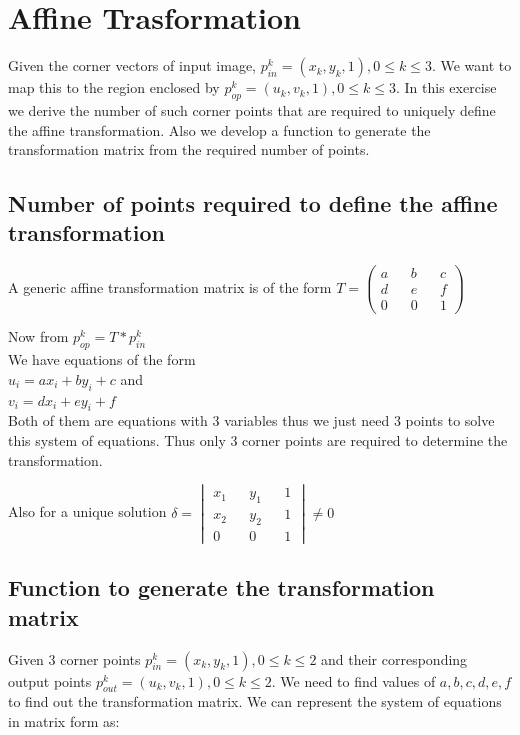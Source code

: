 \documentclass[paper=a4, fontsize=11pt]{scrartcl} %
\numberwithin{equation}{section} %
\numberwithin{figure}{section} %
\numberwithin{table}{section} %
\begin{document}
\section{Affine Trasformation}

Given the corner vectors of input image, \(p_{in}^k = (x_k,y_k,1), 0 \leq k \leq 3\). We want to map this to the region enclosed by \(p_{op}^k = (u_k,v_k,1), 0 \leq k \leq 3 \). In this exercise we derive the number of such corner points that are required to uniquely define the affine transformation. Also we develop a function to generate the transformation matrix from the required number of points.


\subsection{Number of points required to define the affine transformation}

A generic affine transformation matrix is of the form
\(
  T = 
  \begin{pmatrix}
    a && b && c\\
    d && e && f\\
    0 && 0 && 1
  \end{pmatrix}
\) 

Now from \(p_{op}^k = T*p_{in}^k\)\\
We have equations of the form \\
\(u_i = ax_i + by_i + c\) and\\
\(v_i = dx_i + ey_i + f\)\\
Both of them are equations with 3 variables thus we just need 3 points to solve this system of equations. Thus only 3 corner points are required to determine the transformation.

Also for a unique solution
\(
  \delta = 
  \begin{vmatrix}
    x_1 && y_1 && 1 \\
    x_2 && y_2 && 1 \\
    0 && 0 && 1
  \end{vmatrix} 
  \neq 0
\)



\subsection{Function to generate the transformation matrix}

Given 3 corner points \(p_{in}^k = (x_k,y_k,1), 0 \leq k \leq 2\) and their corresponding output points \(p_{out}^k = (u_k,v_k,1), 0 \leq k \leq 2\). We need to find values of \(a,b,c,d,e,f\) to find out the transformation matrix. We can represent the system of equations in matrix form as:
\end{document}
